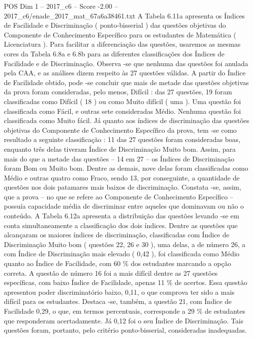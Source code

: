\begin{textsample}{POS Dim 1 – 2017\_c6 – Score -2.00 – 2017\_c6/enade\_2017\_mat\_67a6a38461.txt}
A Tabela 6.11a apresenta os Índices de Facilidade e Discriminação ( ponto-bisserial ) das questões objetivas do Componente de Conhecimento Específico para os estudantes de Matemática ( Licenciatura ).
Para facilitar a diferenciação das questões, usaremos as mesmas cores da Tabela 6.8a e 6.8b para as diferentes classificações dos Índices de Facilidade e de Discriminação.
Observa -se que nenhuma das questões foi anulada pela CAA, e as análises dizem respeito às 27 questões válidas.
A partir do Índice de Facilidade obtido, pode -se concluir que mais de metade das questões objetivas da prova foram consideradas, pelo menos, Difícil : das 27 questões, 19 foram classificadas como Difícil ( 18 ) ou como Muito difícil ( uma ).
Uma questão foi classificada como Fácil, e outras sete consideradas Médio.
Nenhuma questão foi classificada como Muito fácil.
Já quanto aos índices de discriminação das questões objetivas do Componente de Conhecimento Específico da prova, tem -se como resultado a seguinte classificação : 11 das 27 questões foram consideradas boas, enquanto três delas tiveram Índice de Discriminação Muito bom.
Assim, para mais do que a metade das questões – 14 em 27 – os Índices de Discriminação foram Bom ou Muito bom.
Dentre as demais, nove delas foram classificadas como Médio e outras quatro como Fraco, sendo 13, por conseguinte, a quantidade de questões nos dois patamares mais baixos de discriminação.
Constata -se, assim, que a prova – no que se refere ao Componente de Conhecimento Específico – possuía capacidade média de discriminar entre aqueles que dominavam ou não o conteúdo.
A Tabela 6.12a apresenta a distribuição das questões levando -se em conta simultaneamente a classificação dos dois índices.
Dentre as questões que alcançaram os maiores índices de discriminação, classificadas com Índice de Discriminação Muito bom ( questões 22, 26 e 30 ), uma delas, a de número 26, a com Índice de Discriminação mais elevado ( 0,42 ), foi classificada como Médio quanto ao Índice de Facilidade, com 60 \% dos estudantes marcando a opção correta.
A questão de número 16 foi a mais difícil dentre as 27 questões específicas, com baixo Índice de Facilidade, apenas 11 \% de acertos.
Essa questão apresentou poder discriminatório baixo, 0,11, o que comprova ter sido a mais difícil para os estudantes.
Destaca -se, também, a questão 21, com Índice de Facilidade 0,29, o que, em termos percentuais, corresponde a 29 \% de estudantes que responderam acertadamente.
Já 0,12 foi o seu Índice de Discriminação.
Tais questões foram, portanto, pelo critério ponto-bisserial, consideradas inadequadas.

\end{textsample}
